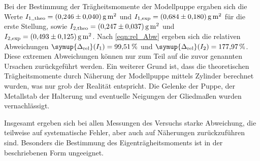 Bei der Bestimmung der Trägheitsmomente der Modellpuppe ergaben sich die Werte $I_{1,\text{,theo}} = \qty{0.246+-0.040}{\gram\metre\squared}$ und 
$I_{1\text{,exp}} = \qty{0.684+-0.180}{\gram\metre\squared}$ für die erste Stellung, sowie $I_{2\text{,theo}} = \qty{0.247+-0.037}{\gram\metre\squared}$ und 
$I_{2\text{,exp}} = \qty{0.493+-0.125}{\gram\metre\squared}$. Nach \autoref{eqn:rel_Abw} ergeben sich die relativen Abweichungen 
$\symup{\Delta_\text{rel}}(I_1) = \qty{99.51}{\percent}$ und $\symup{\Delta_\text{rel}}(I_2) = \qty{177.97}{\percent}$. Diese extremen Abweichungen können nur zum Teil
auf die zuvor genannten Ursachen zurückgeführt werden. Ein weiterer Grund ist, dass die theoretischen Trägheitsmomente durch Näherung der Modellpuppe mittels Zylinder berechnet
wurden, was nur grob der Realität entspricht. Die Gelenke der Puppe, der Metallstab der Halterung und eventuelle Neigungen der Gliedmaßen wurden vernachlässigt.

Insgesamt ergeben sich bei allen Messungen des Versuchs starke Abweichung, die teilweise auf systematische Fehler, aber auch auf Näherungen zurückzuführen sind. Besonders die 
Bestimmung des Eigenträgheitsmoments ist in der beschriebenen Form ungeeignet. 
